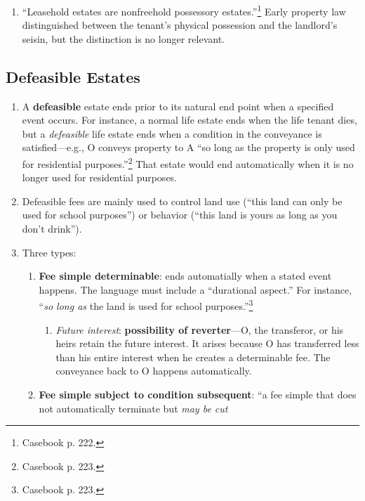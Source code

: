 \begin{enumerate}
    \item ``Leasehold estates are nonfreehold possessory 
    estates.''\footnote{Casebook p. 222.} Early property law distinguished 
    between the tenant's physical possession and the landlord's seisin, but 
    the distinction is no longer relevant.
\end{enumerate}

\subsection{Defeasible Estates}

\begin{enumerate}
    \item A \textbf{defeasible} estate ends prior to its natural end point 
    when a specified event occurs. For instance, a normal life estate ends 
    when the life tenant dies, but a \emph{defeasible} life estate ends when a 
    condition in the conveyance is satisfied---e.g., O conveys property to A 
    ``so long as the property is only used for residential 
    purposes.''\footnote{Casebook p. 223.} That estate would end automatically 
    when it is no longer used for residential purposes.
    \item Defeasible fees are mainly used to control land use (``this land can 
    only be used for school purposes'') or behavior (``this land is yours as 
    long as you don't drink'').
    \item Three types:
    \begin{enumerate}
        \item \textbf{Fee simple determinable}: ends automatially when a 
        stated event happens. The language must include a ``durational 
        aspect.'' For instance, ``\emph{so long as} the land is used for 
        school purposes.''\footnote{Casebook p. 223.}
        \begin{enumerate}
            \item \emph{Future interest}: \textbf{possibility of 
            reverter}---O, the transferor, or his heirs retain the future 
            interest. It arises because O has transferred less than his entire 
            interest when he creates a determinable fee. The conveyance back 
            to O happens automatically.
        \end{enumerate}
        \item \textbf{Fee simple subject to condition subsequent}: ``a fee 
        simple that does not automatically terminate but \emph{may be cut 
}
\end{enumerate}
\end{enumerate}
